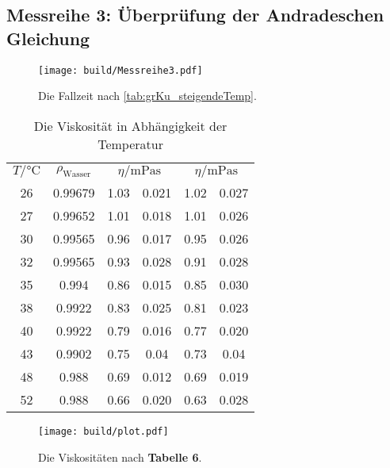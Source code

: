 
\subsection[]{Messreihe 3: Überprüfung der Andradeschen Gleichung}
\begin{figure}
    \centering
    \texttt{[image: build/Messreihe3.pdf]}
    \caption{Die Fallzeit nach \ref{tab:grKu_steigendeTemp}.}
    \label{fig:groKu_steigendeTemp}
\end{figure}

\begin{table}
    \centering
    \begin{tabular}[]{S[table-format=2.0] S[table-format=0.5] S @{${}\pm{}$} S[table-format=1.3] S @{${}\pm{}$} S[table-format=1.3]}
        \toprule
        {$T /\unit{\celsius}$} & {$\rho_{\text{Wasser}}$ \cite{geschke}} &  &  \\
            26  &  0.99679   & 1.03  & 0.021 &        1.02 & 0.027  \\
            27  &  0.99652   & 1.01  & 0.018 &        1.01 & 0.026  \\
            30  &  0.99565   & 0.96  & 0.017 &        0.95 & 0.026  \\
            32  &  0.99565   & 0.93  & 0.028 &        0.91 & 0.028  \\
            35  &  0.994     & 0.86  & 0.015 &        0.85 & 0.030  \\
            38  &  0.9922    & 0.83  & 0.025 &        0.81 & 0.023  \\
            40  &  0.9922    & 0.79  & 0.016 &        0.77 & 0.020  \\
            43  &  0.9902    & 0.75  & 0.04  &        0.73 & 0.04   \\
            48  &  0.988     & 0.69  & 0.012 &        0.69 & 0.019  \\
            52  &  0.988     & 0.66  & 0.020 &        0.63 & 0.028  \\
    \end{tabular}
    \label{tab:viskositaeten_temp}
    \caption{Die Viskosität in Abhängigkeit der Temperatur}
\end{table}
\begin{figure}
    \centering
    \texttt{[image: build/plot.pdf]}
    \caption{Die Viskositäten nach \textbf{Tabelle 6}.}
    \label{fig:groKu_steigendeTemp_eta}
\end{figure}


